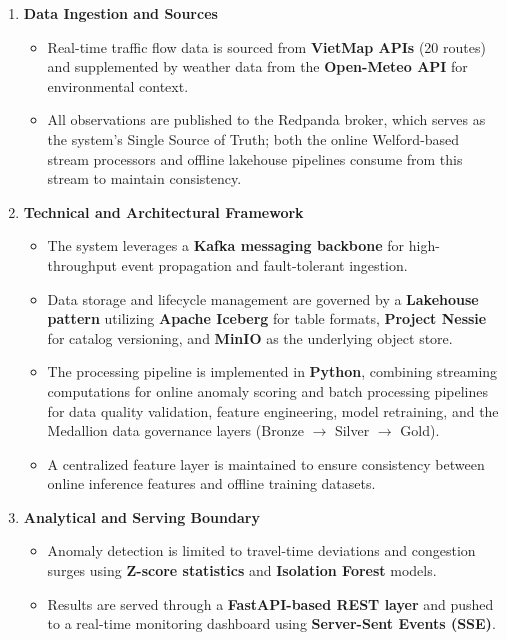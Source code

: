 \begin{enumerate}
\item \textbf{Data Ingestion and Sources}
\begin{itemize}
\item Real-time traffic flow data is sourced from \textbf{VietMap APIs} (20 routes) and supplemented by weather data from the \textbf{Open-Meteo API} for environmental context.
\item All observations are published to the Redpanda broker, which serves as the system's Single Source of Truth; both the online Welford-based stream processors and offline lakehouse pipelines consume from this stream to maintain consistency.
\end{itemize}
\item \textbf{Technical and Architectural Framework}
\begin{itemize}
\item The system leverages a \textbf{Kafka messaging backbone} for high-throughput event propagation and fault-tolerant ingestion.
\item Data storage and lifecycle management are governed by a \textbf{Lakehouse pattern} utilizing \textbf{Apache Iceberg} for table formats, \textbf{Project Nessie} for catalog versioning, and \textbf{MinIO} as the underlying object store.
\item The processing pipeline is implemented in \textbf{Python}, combining streaming computations for online anomaly scoring and batch processing pipelines for data quality validation, feature engineering, model retraining, and the Medallion data governance layers (Bronze $\rightarrow$ Silver $\rightarrow$ Gold).
\item A centralized feature layer is maintained to ensure consistency between online inference features and offline training datasets.
\end{itemize}
\item \textbf{Analytical and Serving Boundary}
\begin{itemize}
\item Anomaly detection is limited to travel-time deviations and congestion surges using \textbf{Z-score statistics} and \textbf{Isolation Forest} models.
\item Results are served through a \textbf{FastAPI-based REST layer} and pushed to a real-time monitoring dashboard using \textbf{Server-Sent Events (SSE)}.
\end{itemize}
\end{enumerate}

